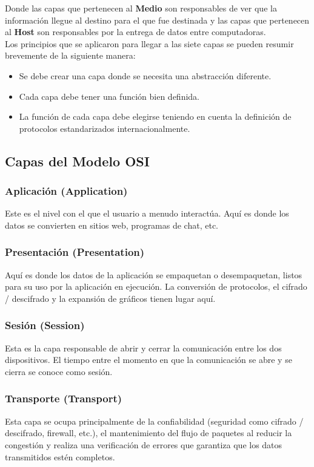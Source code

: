 Donde las capas que pertenecen al \textbf{Medio} son responsables de ver que la información llegue al destino para el que fue destinada y las capas que pertenecen al \textbf{Host} son responsables por la entrega de datos entre computadoras.
\\$ { }$\\
Los principios que se aplicaron para llegar a las siete capas se pueden resumir brevemente de la siguiente manera:
\begin{itemize}
\item Se debe crear una capa donde se necesita una abstracción diferente.
\item Cada capa debe tener una función bien definida.
\item La función de cada capa debe elegirse teniendo en cuenta la definición de protocolos estandarizados internacionalmente.
\end{itemize}
\subsection{Capas del Modelo OSI}



\subsubsection{Aplicación (Application)}
Este es el nivel con el que el usuario a menudo interactúa. Aquí es donde los datos se convierten en sitios web, programas de chat, etc.

\subsubsection{Presentación (Presentation)}
Aquí es donde los datos de la aplicación se empaquetan o desempaquetan, listos para su uso por la aplicación en ejecución. La conversión de protocolos, el cifrado / descifrado y la expansión de gráficos tienen lugar aquí.
\subsubsection{Sesión (Session)}
Esta es la capa responsable de abrir y cerrar la comunicación entre los dos dispositivos. El tiempo entre el momento en que la comunicación se abre y se cierra se conoce como sesión.
\subsubsection{Transporte (Transport)}
Esta capa se ocupa principalmente de la confiabilidad (seguridad como cifrado / descifrado, firewall, etc.), el mantenimiento del flujo de paquetes al reducir la congestión y realiza una verificación de errores que garantiza que los datos transmitidos estén completos.
